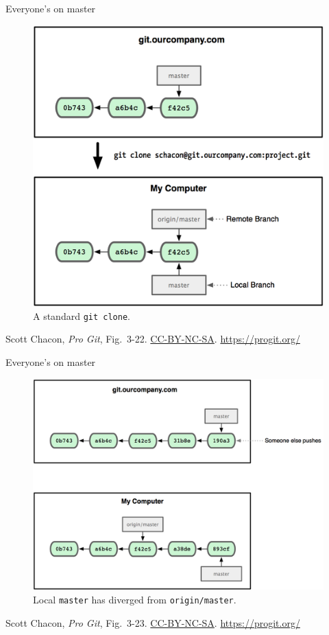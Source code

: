 \begin{frame}{Everyone's on master}
  \begin{figure}
    \includegraphics[scale=0.8]{18333fig0322-tn.png}
    \\ A standard \texttt{git clone}.
  \end{figure}
  \footnotesize{Scott Chacon,
    \emph{Pro Git},
    Fig.~3-22.
    \href{https://creativecommons.org/licenses/by-nc-sa/3.0/legalcode}{CC-BY-NC-SA}.
    \href{https://progit.org/}{https://progit.org/}}
\end{frame}

\begin{frame}{Everyone's on master}
  \begin{figure}
    \includegraphics[scale=0.8]{18333fig0323-tn.png}
    \\ Local \texttt{master} has diverged from \texttt{origin/master}.
  \end{figure}
  \footnotesize{Scott Chacon,
    \emph{Pro Git},
    Fig.~3-23.
    \href{https://creativecommons.org/licenses/by-nc-sa/3.0/legalcode}{CC-BY-NC-SA}.
    \href{https://progit.org/}{https://progit.org/}}
\end{frame}

